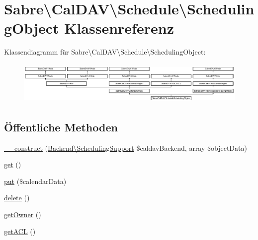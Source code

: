 \hypertarget{class_sabre_1_1_cal_d_a_v_1_1_schedule_1_1_scheduling_object}{}\section{Sabre\textbackslash{}Cal\+D\+AV\textbackslash{}Schedule\textbackslash{}Scheduling\+Object Klassenreferenz}
\label{class_sabre_1_1_cal_d_a_v_1_1_schedule_1_1_scheduling_object}
Klassendiagramm für Sabre\textbackslash{}Cal\+D\+AV\textbackslash{}Schedule\textbackslash{}Scheduling\+Object\+:\begin{figure}[H]
\begin{center}
\leavevmode
\includegraphics[height=2.089552cm]{class_sabre_1_1_cal_d_a_v_1_1_schedule_1_1_scheduling_object}
\end{center}
\end{figure}
\subsection*{Öffentliche Methoden}
\begin{DoxyCompactItemize}
\item 
\mbox{\hyperlink{class_sabre_1_1_cal_d_a_v_1_1_schedule_1_1_scheduling_object_afacf850aa5840bb5c56943345a06547e}{\+\_\+\+\_\+construct}} (\mbox{\hyperlink{interface_sabre_1_1_cal_d_a_v_1_1_backend_1_1_scheduling_support}{Backend\textbackslash{}\+Scheduling\+Support}} \$caldav\+Backend, array \$object\+Data)
\item 
\mbox{\hyperlink{class_sabre_1_1_cal_d_a_v_1_1_schedule_1_1_scheduling_object_a98094b6dd7d1113b10f2b492e956d6e7}{get}} ()
\item 
\mbox{\hyperlink{class_sabre_1_1_cal_d_a_v_1_1_schedule_1_1_scheduling_object_ad133bc9b14a66ff31e11041cb1013e51}{put}} (\$calendar\+Data)
\item 
\mbox{\hyperlink{class_sabre_1_1_cal_d_a_v_1_1_schedule_1_1_scheduling_object_a56f2a1953af9daf7d6cdf515e36fb1d1}{delete}} ()
\item 
\mbox{\hyperlink{class_sabre_1_1_cal_d_a_v_1_1_schedule_1_1_scheduling_object_a0273452750e1669a154a6f98a7b93132}{get\+Owner}} ()
\item 
\mbox{\hyperlink{class_sabre_1_1_cal_d_a_v_1_1_schedule_1_1_scheduling_object_a4ceae3dda6c56e995dc4a0a973446389}{get\+A\+CL}} ()
\end{DoxyCompactItemize}
